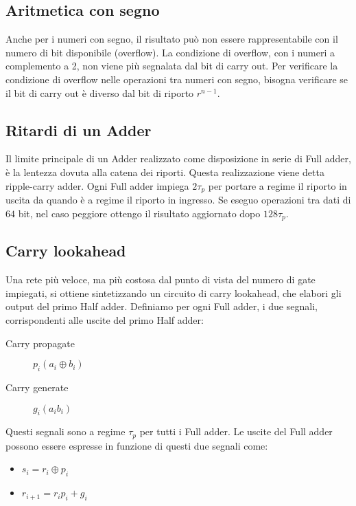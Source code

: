 \documentclass{subfiles}
\begin{document}
\subsection{Aritmetica con segno}

Anche per i numeri con segno, il risultato può non essere rappresentabile con il numero di bit disponibile (overflow).
La condizione di overflow, con i numeri a complemento a 2, non viene più segnalata dal bit di carry out.
Per verificare la condizione di overflow nelle operazioni tra numeri con segno, bisogna verificare se il bit di carry out è diverso dal bit di riporto $r^{n-1}$.

\subsection{Ritardi di un Adder}

Il limite principale di un Adder realizzato come disposizione in serie di Full adder, è la lentezza dovuta alla catena dei riporti.
Questa realizzazione viene detta ripple-carry adder.
Ogni Full adder impiega $2 \tau_p$ per portare a regime il riporto in uscita da quando è a regime il riporto in ingresso.
Se eseguo operazioni tra dati di $64$ bit, nel caso peggiore ottengo il risultato aggiornato dopo $128 \tau_p$.

\subsection{Carry lookahead}

Una rete più veloce, ma più costosa dal punto di vista del numero di gate impiegati, si ottiene sintetizzando un circuito di carry lookahead, che elabori gli output del primo Half adder.
Definiamo per ogni Full adder, i due segnali, corrispondenti alle uscite del primo Half adder:

\begin{description}
    \item[Carry propagate] $p_i (a_i \oplus b_i)$
    \item[Carry generate] $g_i (a_i b_i)$
\end{description}

\noindent
Questi segnali sono a regime $\tau_p$ per tutti i Full adder.
Le uscite del Full adder possono essere espresse in funzione di questi due segnali come:

\begin{itemize}
    \item $s_i = r_i \oplus p_i$
    \item $r_{i+1} = r_i p_i + g_i$
\end{itemize}
\end{document}
